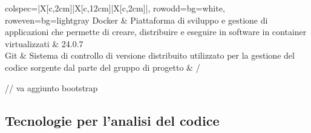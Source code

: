 \begin{center}
\begin{longtblr}{
		colspec={|X[c,2cm]|X[c,12cm]|X[c,2cm]|},
		row{odd}={bg=white},
		row{even}={bg=lightgray}
		}
		Docker                                                                       & Piattaforma di sviluppo e gestione di applicazioni che permette di creare, distribuire e eseguire in software in container virtualizzati          & 24.0.7            \\ \hline
		Git                                                                          & Sistema di controllo di versione distribuito utilizzato per la gestione del codice sorgente dal parte del gruppo di progetto                      & /                 \\ \hline
	\end{longtblr}
\end{center}

// va aggiunto bootstrap

\subsection{Tecnologie per l'analisi del codice}
